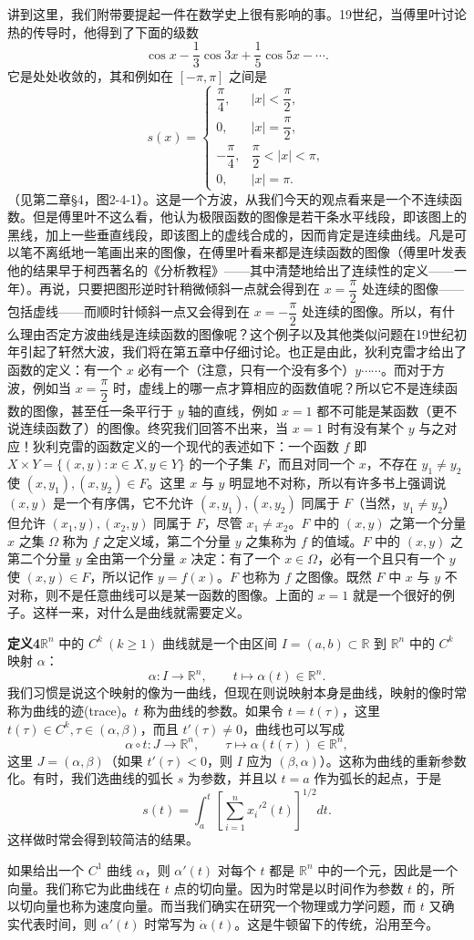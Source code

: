 讲到这里，我们附带要提起一件在数学史上很有影响的事。19世纪，当傅里叶讨论热的传导时，他得到了下面的级数
\[
 \cos x-\frac13\cos3x+\frac15\cos5x-\cdots.
\]
它是处处收敛的，其和例如在 $[-\pi,\pi]$ 之间是
\[
 s(x)=\begin{cases}
 \dfrac{\pi}{4},& |x|<\dfrac{\pi}{2},\\[3pt]
 0,& |x|=\dfrac{\pi}{2},\\[3pt]
 -\dfrac{\pi}{4},& \dfrac{\pi}{2}<|x|<\pi,\\[3pt]
 0,& |x|=\pi.
 \end{cases}
\]
（见第二章§4，图2-4-1）。这是一个方波，从我们今天的观点看来是一个不连续函数。但是傅里叶不这么看，他认为极限函数的图像是若干条水平线段，即该图上的黑线，加上一些垂直线段，即该图上的虚线合成的，因而肯定是连续曲线。凡是可以笔不离纸地一笔画出来的图像，在傅里叶看来都是连续函数的图像（傅里叶发表他的结果早于柯西著名的《分析教程》——其中清楚地给出了连续性的定义——一年）。再说，只要把图形逆时针稍微倾斜一点就会得到在 $x=\dfrac{\pi}{2}$ 处连续的图像——包括虚线——而顺时针倾斜一点又会得到在 $x=-\dfrac{\pi}{2}$ 处连续的图像。所以，有什么理由否定方波曲线是连续函数的图像呢？这个例子以及其他类似问题在19世纪初年引起了轩然大波，我们将在第五章中仔细讨论。也正是由此，狄利克雷才给出了函数的定义：有一个 $x$ 必有一个（注意，只有一个没有多个）$y\cdots\cdots$。而对于方波，例如当 $x=\dfrac{\pi}{2}$ 时，虚线上的哪一点才算相应的函数值呢？所以它不是连续函数的图像，甚至任一条平行于 $y$ 轴的直线，例如 $x=1$ 都不可能是某函数（更不说连续函数了）的图像。终究我们回答不出来，当 $x=1$ 时有没有某个 $y$ 与之对应！狄利克雷的函数定义的一个现代的表述如下：一个函数 $f$ 即 $X\times Y=\{(x,y):x\in X,y\in Y\}$ 的一个子集 $F$，而且对同一个 $x$，不存在 $y_1\ne y_2$ 使 $(x,y_1),(x,y_2)\in F$。这里 $x$ 与 $y$ 明显地不对称，所以有许多书上强调说 $(x,y)$ 是一个有序偶，它不允许 $(x,y_1),(x,y_2)$ 同属于 $F$（当然，$y_1\ne y_2$）但允许 $(x_1,y),(x_2,y)$ 同属于 $F$，尽管 $x_1\ne x_2$。$F$ 中的 $(x,y)$ 之第一个分量 $x$ 之集 $\Omega$ 称为 $f$ 之定义域，第二个分量 $y$ 之集称为 $f$ 的值域。$F$ 中的 $(x,y)$ 之第二个分量 $y$ 全由第一个分量 $x$ 决定：有了一个 $x\in\Omega$，必有一个且只有一个 $y$ 使 $(x,y)\in F$，所以记作 $y=f(x)$。$F$ 也称为 $f$ 之图像。既然 $F$ 中 $x$ 与 $y$ 不对称，则不是任意曲线可以是某一函数的图像。上面的 $x=1$ 就是一个很好的例子。这样一来，对什么是曲线就需要定义。

\noindent\textbf{定义4}\quad $\mathbb R^n$ 中的 $C^k\ (k\ge1)$ 曲线就是一个由区间 $I=(a,b)\subset\mathbb R$ 到 $\mathbb R^n$ 中的 $C^k$ 映射 $\alpha$：
\begin{equation}
 \alpha:I\to\mathbb R^n,\qquad t\mapsto\alpha(t)\in\mathbb R^n.
 \tag{27}
\end{equation}
我们习惯是说这个映射的像为一曲线，但现在则说映射本身是曲线，映射的像时常称为曲线的迹(trace)。$t$ 称为曲线的参数。如果令 $t=t(\tau)$，这里 $t(\tau)\in C^k,\tau\in(\alpha,\beta)$，而且 $t'(\tau)\ne0$，曲线也可以写成
\[
 \alpha\circ t:J\to\mathbb R^n,\qquad \tau\mapsto\alpha(t(\tau))\in\mathbb R^n,
\]
这里 $J=(\alpha,\beta)$（如果 $t'(\tau)<0$，则 $I$ 应为 $(\beta,\alpha)$）。这称为曲线的重新参数化。有时，我们选曲线的弧长 $s$ 为参数，并且以 $t=a$ 作为弧长的起点，于是
\[
 s(t)=\int_a^t\left[\sum_{i=1}^n x_i'^2(t)\right]^{1/2}dt.
\]
这样做时常会得到较简洁的结果。

如果给出一个 $C^1$ 曲线 $\alpha$，则 $\alpha'(t)$ 对每个 $t$ 都是 $\mathbb R^n$ 中的一个元，因此是一个向量。我们称它为此曲线在 $t$ 点的切向量。因为时常是以时间作为参数 $t$ 的，所以切向量也称为速度向量。而当我们确实在研究一个物理或力学问题，而 $t$ 又确实代表时间，则 $\alpha'(t)$ 时常写为 $\dot\alpha(t)$。这是牛顿留下的传统，沿用至今。
